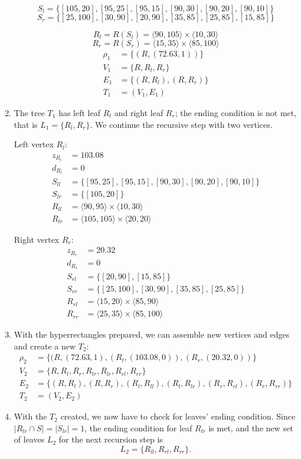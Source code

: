 \begin{example}
\begin{enumerate}
$$S_l = \{[105,20],[95,25],[95,15],[90,30],[90,20],[90,10]\}$$
$$S_r = \{[25,100],[30,90],[20,90],[35,85],[25,85],[15,85]\}$$

$$R_l = R(S_l) = \langle 90, 105 \rangle \times \langle 10, 30 \rangle$$
$$R_r = R(S_r) = \langle 15, 35 \rangle \times \langle 85, 100 \rangle$$
\begin{align*}
\rho_1 &= \{ (R, (72.63, 1))\}\\
V_1 &= \{R, R_l, R_r\}\\
E_1 &= \{(R,R_l), (R,R_r)\}\\
T_1 &= (V_1, E_1)
\end{align*}
\item The tree $T_1$ has left leaf $R_l$ and right leaf $R_r$; the ending condition is not met, that is $L_1 = \{R_l,R_r\}$. We continue the recursive step with two vertices.

Left vertex $R_l$:
\begin{align*}
z_{R_l} &= 103.08\\
d_{R_l} &= 0\\
S_{ll} &= \{[95,25],[95,15],[90,30],[90,20],[90,10]\}\\
S_{lr} &= \{[105,20]\}\\
R_{ll} &= \langle 90, 95 \rangle \times \langle 10, 30\rangle\\
R_{lr} &= \langle 105, 105 \rangle \times \langle 20, 20\rangle
\end{align*}

Right vertex $R_r$:
\begin{align*}
z_{R_r}&= 20.32\\
d_{R_r}&= 0\\
S_{rl}&= \{[20,90],[15,85]\}\\
S_{rr}&= \{[25,100],[30,90],[35,85],[25,85]\}\\
R_{rl}&= \langle 15, 20 \rangle \times \langle 85, 90 \rangle\\
R_{rr}&= \langle 25, 35 \rangle \times \langle 85, 100 \rangle
\end{align*}
\item With the hyperrectangles prepared, we can assemble new vertices and edges and create a new $T_2$:
\begin{align*}
\rho_2 &= \{(R,(72.63,1), (R_l, (103.08, 0)), (R_r, (20.32, 0)) \}\\
V_2 &= \{ R, R_l, R_r, R_{lr}, R_{lr}, R_{rl}, R_{rr} \}\\
E_2 &= \{ (R,R_l),(R,R_r), (R_l,R_{ll}), (R_l,R_{lr}), (R_r,R_{rl}), (R_r,R_{rr}) \}\\
T_2 &= (V_2, E_2)
\end{align*}
\item With the $T_2$ created, we now have to check for leaves' ending condition. Since $|R_{lr}\cap S|=|S_{lr}| = 1$, the ending condition for leaf $R_{lr}$ is met, and the new set of leaves $L_2$ for the next recursion step is
$$L_2 = \{R_{ll},R_{rl},R_{rr}\}.$$


\end{enumerate}
\end{example}
